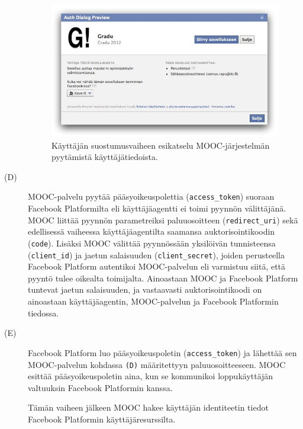 \documentclass[finnish,gradu]{tktltiki}
\begin{document}
\begin{description}

  \begin{figure}
    \centering
    \includegraphics[width=1.0\textwidth]{images/facebook_auth_dialog.jpg}
    \caption{Käyttäjän suostumusvaiheen esikatselu MOOC-järjestelmän pyytämistä käyttäjätiedoista.}
    \label{fig:facebook_auth_dialog}
  \end{figure}


  \item[(D)]
    MOOC-palvelu pyytää pääsyoikeuspolettia (\verb!access_token!) suoraan Facebook Platformilta eli käyttäjäagentti ei toimi pyynnön välittäjänä. MOOC liittää pyynnön parametreiksi paluuosoitteen (\verb!redirect_uri!) sekä edellisessä vaiheessa käyttäjäagentilta saamansa auktorisointikoodin (\verb!code!). Lisäksi MOOC välittää pyynnössään yksilöivän tunnisteensa (\verb!client_id!) ja jaetun salaisuuden (\verb!client_secret!), joiden perusteella Facebook Platform autentikoi MOOC-palvelun eli varmistuu siitä, että pyyntö tulee oikealta toimijalta. Ainoastaan MOOC ja Facebook Platform tuntevat jaetun salaisuuden, ja vastaavasti auktorisointikoodi on ainoastaan käyttäjäagentin, MOOC-palvelun ja Facebook Platformin tiedossa.



  \item[(E)]
  Facebook Platform luo pääsyoikeuspoletin (\verb!access_token!) ja lähettää sen MOOC-palvelun kohdassa \verb!(D)! määritettyyn paluuosoitteeseen. MOOC esittää pääsyoikeuspoletin aina, kun se kommunikoi loppukäyttäjän valtuuksin Facebook Platformin kanssa.

  Tämän vaiheen jälkeen MOOC hakee käyttäjän identiteetin tiedot Facebook Platformin käyttäjäresurssilta.

  \end{description}
\end{document}
